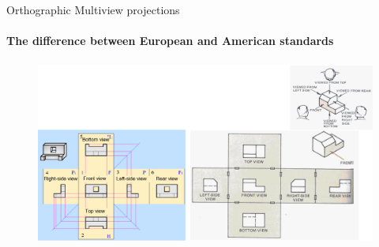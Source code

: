 \documentclass[aspectratio=169]{beamer}
\begin{document}
\begin{frame}[t]{Orthographic Multiview projections}
    \framesubtitle{The difference between European and American standards}
    \vspace{-0.6cm}
    \begin{figure}[H]
        \centering\includegraphics[height=6cm,width=1\textwidth,keepaspectratio]{resources/views.png}
        \label{fig:resources/views.png}
    \end{figure}
\end{frame}
\end{document}
